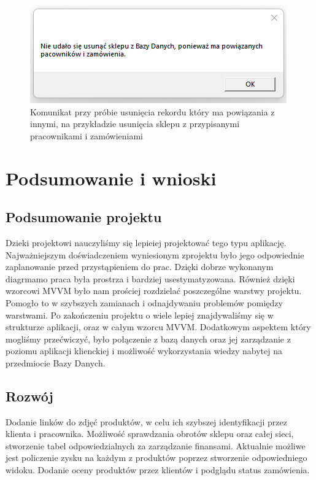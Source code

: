 \documentclass[12pt,a4paper]{article}
\begin{document}
        \begin{figure}[H]
            \centering
            \includegraphics{images/komunikat2.png}
            \caption{Komunikat przy próbie usunięcia rekordu który ma powiązania z innymi, na przykładzie usunięcia sklepu z przypisanymi pracownikami i zamówieniami}
        \end{figure}
        
\section{Podsumowanie i wnioski}
    \subsection{Podsumowanie projektu}
        Dzieki projektowi nauczyliśmy się lepieiej projektować tego typu aplikację. Najważniejszym doświadczeniem wyniesionym zprojektu było jego odpowiednie zaplanowanie przed przystąpieniem do prac. Dzięki dobrze wykonanym diagrmamo praca była prostrza i bardziej usestymatyzowana. Również dzięki wzorcowi MVVM było nam prościej rozdzielać poszczególne warstwy projektu. Pomogło to w szybszych zamianach i odnajdywaniu problemów pomiędzy warstwami. Po zakończeniu projektu o wiele lepiej znajdywaliśmy się w strukturze aplikacji, oraz w całym wzorcu MVVM. Dodatkowym aspektem który mogliśmy przećwiczyć, było połączenie z bazą danych oraz jej zarządzanie z poziomu aplikacji klienckiej i możliwość wykorzystania wiedzy nabytej na przedmiocie Bazy Danych.
            
    \subsection{Rozwój}
        Dodanie linków do zdjęć produktów, w celu ich szybszej identyfikacji przez klienta i pracownika. Możliwość sprawdzania obrotów sklepu oraz całej sieci, stworzenie tabel odpowiedzialnych za zarządzanie finansami. Aktualnie możliwe jest policzenie zysku na każdym z produktów poprzez stworzenie odpowiedniego widoku. Dodanie oceny produktów przez klientów i podglądu status zamówienia. 
\end{document}
